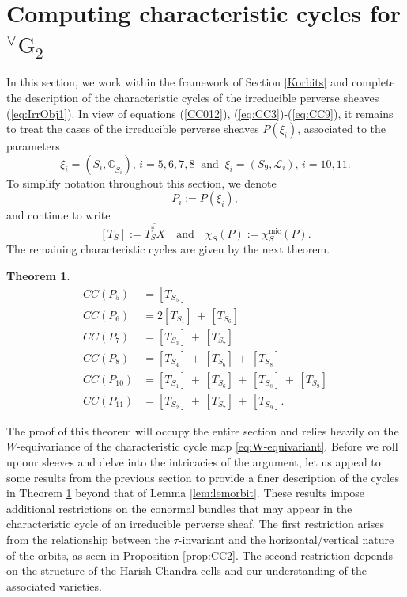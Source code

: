 \documentclass[a4paper, 11pt]{article}
\newtheorem{theo}{Theorem}[section]
\begin{document}
\section{Computing characteristic cycles for
  ${}^{\vee}\mathrm{G}_{2}$}\label{section:G2computations} 
In this section, we work within the framework of Section \ref{Korbits}
and complete the description of the characteristic cycles of the
irreducible perverse sheaves (\ref{eq:IrrObj1}).  In view of equations
(\ref{CC012}), (\ref{eq:CC3})-(\ref{eq:CC9}), it remains to treat the
cases of the 
irreducible perverse sheaves $P(\xi_i)$, associated to the parameters 
$$\xi_i=\left(S_i,\underline{\mathbb{C}}_{S_i}\right),\, i=5,6,7,8
\ \text{ and }\ \xi_i=\left(S_9,\mathcal{L}_{i}\right),\, i=10,11.$$
To simplify notation throughout this section, we denote
$$
P_i:=P(\xi_i),
$$
and continue to write
$$
[T_S]:=\overline{T_S^\ast X}\quad\text{and}\quad \chi_{S}^{}(P):=
\chi_{S}^{\mathrm{mic}}(P).
$$
The remaining characteristic cycles are given by the next theorem.
\begin{theo}\label{theo:CCs}
\begin{align*}
CC(P_{5})&= [T_{S_5}]\\
CC(P_{6})&= 2[T_{S_1}]\, +\, 
[T_{S_6}]\\
CC(P_{7})&= [T_{S_3}]\, +\, 
[T_{S_7}]\\
CC(P_8)&= [T_{S_4}]\, +\, 
[T_{S_6}]\, +\, [T_{S_8}]\\
CC(P_{10})&=[T_{S_1}]\, +\, 
[T_{S_6}]\, +\, 
[T_{S_8}]\, +\, [T_{S_9}]\\
CC(P_{11})&=[T_{S_2}]\, +\, [T_{S_7}]\, +\, [T_{S_9}].
\end{align*}
\end{theo}
The proof of this theorem will occupy the entire section and relies
heavily on the $W$-equivariance of the characteristic cycle map
\eqref{eq:W-equivariant}. Before we roll up our sleeves and delve into
the intricacies of the argument, let us appeal to some results from
the previous section to provide a finer 
description of the cycles in Theorem \ref{theo:CCs} beyond that of
Lemma \ref{lem:lemorbit}. 
These results impose additional restrictions on the conormal bundles
that may appear in the characteristic cycle of an irreducible perverse
sheaf. The first restriction arises from the relationship between the
$\tau$-invariant and the horizontal/vertical nature of the orbits, as
seen in Proposition \ref{prop:CC2}. The second restriction
depends on the structure of the Harish-Chandra cells and our
understanding of the associated varieties.  
\end{document}
